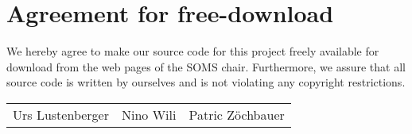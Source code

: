 \documentclass[11pt]{article}
\begin{document}

\newpage


\newpage
\section*{Agreement for free-download}
\bigskip


\bigskip


\large We hereby agree to make our source code for this project freely available for download from the web pages of the SOMS chair. Furthermore, we assure that all source code is written by ourselves and is not violating any copyright restrictions.

\begin{center}

\bigskip


\bigskip


\begin{tabular}{@{}p{4cm}@{}p{4cm}@{}@{}p{4cm}@{}}

\begin{minipage}{4cm}
\vspace{2cm}
\large Urs Lustenberger
\end{minipage}

&

\begin{minipage}{4cm}

\vspace{2cm}
 \large \hspace{4mm} Nino Wili

\end{minipage}

&

\begin{minipage}{4cm}
\vspace{2cm}
\large Patric Z\"ochbauer

\end{minipage}
\end{tabular}


\end{center}
\newpage




\end{document}
